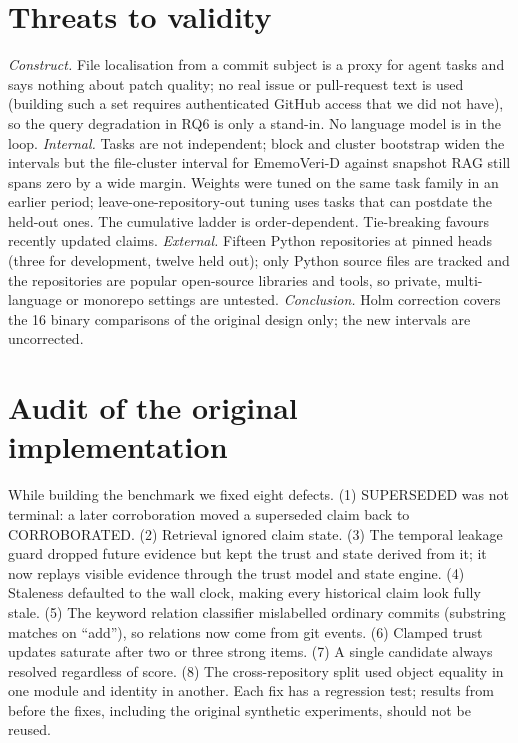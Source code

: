 \documentclass[runningheads]{llncs}
\newcommand{\sys}{EmemoVeri}
\begin{document}
\section{Threats to validity}
\label{sec:threats}
\emph{Construct.} File localisation from a commit subject is a proxy for agent tasks and says nothing about patch quality; no real issue or pull-request text is used (building such a set requires authenticated GitHub access that we did not have), so the query degradation in RQ6 is only a stand-in. No language model is in the loop. \emph{Internal.} Tasks are not independent; block and cluster bootstrap widen the intervals but the file-cluster interval for \sys{}-D against snapshot RAG still spans zero by a wide margin. Weights were tuned on the same task family in an earlier period; leave-one-repository-out tuning uses tasks that can postdate the held-out ones. The cumulative ladder is order-dependent. Tie-breaking favours recently updated claims. \emph{External.} Fifteen Python repositories at pinned heads (three for development, twelve held out); only Python source files are tracked and the repositories are popular open-source libraries and tools, so private, multi-language or monorepo settings are untested. \emph{Conclusion.} Holm correction covers the 16 binary comparisons of the original design only; the new intervals are uncorrected.

\section{Audit of the original implementation}
\label{sec:audit}
While building the benchmark we fixed eight defects. (1) SUPERSEDED was not terminal: a later corroboration moved a superseded claim back to CORROBORATED. (2) Retrieval ignored claim state. (3) The temporal leakage guard dropped future evidence but kept the trust and state derived from it; it now replays visible evidence through the trust model and state engine. (4) Staleness defaulted to the wall clock, making every historical claim look fully stale. (5) The keyword relation classifier mislabelled ordinary commits (substring matches on ``add''), so relations now come from git events. (6) Clamped trust updates saturate after two or three strong items. (7) A single candidate always resolved regardless of score. (8) The cross-repository split used object equality in one module and identity in another. Each fix has a regression test; results from before the fixes, including the original synthetic experiments, should not be reused.
\end{document}
